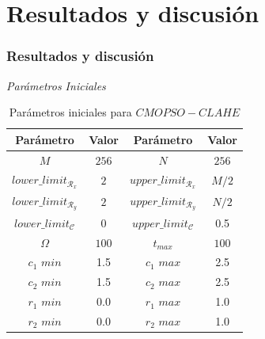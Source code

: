 \documentclass[usenames,dvipsnames]{beamer}
\begin{document}

\section{Resultados y discusión}

\begin{frame}
\frametitle{Resultados y discusión} 
\begin{exampleblock}{\textit{Parámetros Iniciales }}

\end{exampleblock}

\begin{table}[H]
\setlength{\abovecaptionskip}{2pt plus 3pt minus 2pt} %
\caption[Parámetros de entrada para $MOPSO$]{Parámetros iniciales para $CMOPSO-CLAHE$}
\begin{center}
\begin{tabular}{||c c | c c||} 
\hline
Parámetro & Valor & Parámetro & Valor \\ [0.5ex] 
\hline\hline
$M$ & $256$ & $N$ & $256$ \\ 
\hline
$lower\_limit_{\mathscr{R}_x}$ & $2$ & $upper\_limit_{\mathscr{R}_x}$ & $M/2$ \\ 
\hline
$lower\_limit_{\mathscr{R}_y}$ & $2$ & $upper\_limit_{\mathscr{R}_y}$ & $N/2$ \\  
\hline
$lower\_limit_{{\mathscr{C}}}$ & $0$ & $upper\_limit_{{\mathscr{C}}}$ & 0.5 \\
\hline
$\Omega$ & $100$ & $t_{max}$ & $100$ \\ 
\hline
$c_1$ $min$ & 1.5 & $c_1$ $max$ & 2.5 \\ 
\hline
$c_2$ $min$ & 1.5 & $c_2$ $max$ & 2.5 \\ 
\hline
$r_1$ $min$ & 0.0 & $r_1$ $max$ & 1.0 \\ 
\hline
$r_2$ $min$ & 0.0 & $r_2$ $max$ & 1.0 \\
\hline
\end{tabular}
\end{center}
\label{table:parametrospso}
\end{table}

\end{frame}
\end{document}
